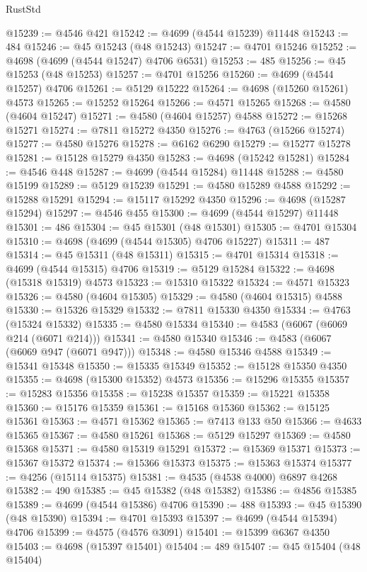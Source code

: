 \begin{lexlean}{RustStd}
\begin{coremodule}
@15239 := @4546 @421
@15242 := @4699 (@4544 @15239) @11448
@15243 := 484
@15246 := @45 @15243 (@48 @15243)
@15247 := @4701 @15246
@15252 := @4698 (@4699 (@4544 @15247) @4706 @6531)
@15253 := 485
@15256 := @45 @15253 (@48 @15253)
@15257 := @4701 @15256
@15260 := @4699 (@4544 @15257) @4706
@15261 := @5129 @15222
@15264 := @4698 (@15260 @15261) @4573
@15265 := @15252 @15264
@15266 := @4571 @15265
@15268 := @4580 (@4604 @15247)
@15271 := @4580 (@4604 @15257) @4588
@15272 := @15268 @15271
@15274 := @7811 @15272 @4350
@15276 := @4763 (@15266 @15274)
@15277 := @4580 @15276
@15278 := @6162 @6290
@15279 := @15277 @15278
@15281 := @15128 @15279 @4350
@15283 := @4698 (@15242 @15281)
@15284 := @4546 @448
@15287 := @4699 (@4544 @15284) @11448
@15288 := @4580 @15199
@15289 := @5129 @15239
@15291 := @4580 @15289 @4588
@15292 := @15288 @15291
@15294 := @15117 @15292 @4350
@15296 := @4698 (@15287 @15294)
@15297 := @4546 @455
@15300 := @4699 (@4544 @15297) @11448
@15301 := 486
@15304 := @45 @15301 (@48 @15301)
@15305 := @4701 @15304
@15310 := @4698 (@4699 (@4544 @15305) @4706 @15227)
@15311 := 487
@15314 := @45 @15311 (@48 @15311)
@15315 := @4701 @15314
@15318 := @4699 (@4544 @15315) @4706
@15319 := @5129 @15284
@15322 := @4698 (@15318 @15319) @4573
@15323 := @15310 @15322
@15324 := @4571 @15323
@15326 := @4580 (@4604 @15305)
@15329 := @4580 (@4604 @15315) @4588
@15330 := @15326 @15329
@15332 := @7811 @15330 @4350
@15334 := @4763 (@15324 @15332)
@15335 := @4580 @15334
@15340 := @4583 (@6067 (@6069 @214 (@6071 @214)))
@15341 := @4580 @15340
@15346 := @4583 (@6067 (@6069 @947 (@6071 @947)))
@15348 := @4580 @15346 @4588
@15349 := @15341 @15348
@15350 := @15335 @15349
@15352 := @15128 @15350 @4350
@15355 := @4698 (@15300 @15352) @4573
@15356 := @15296 @15355
@15357 := @15283 @15356
@15358 := @15238 @15357
@15359 := @15221 @15358
@15360 := @15176 @15359
@15361 := @15168 @15360
@15362 := @15125 @15361
@15363 := @4571 @15362
@15365 := @7413 @133 @50
@15366 := @4633 @15365
@15367 := @4580 @15261
@15368 := @5129 @15297
@15369 := @4580 @15368
@15371 := @4580 @15319 @15291
@15372 := @15369 @15371
@15373 := @15367 @15372
@15374 := @15366 @15373
@15375 := @15363 @15374
@15377 := @4256 (@15114 @15375)
@15381 := @4535 (@4538 @4000) @6897 @4268
@15382 := 490
@15385 := @45 @15382 (@48 @15382)
@15386 := @4856 @15385
@15389 := @4699 (@4544 @15386) @4706
@15390 := 488
@15393 := @45 @15390 (@48 @15390)
@15394 := @4701 @15393
@15397 := @4699 (@4544 @15394) @4706
@15399 := @4575 (@4576 @3091)
@15401 := @15399 @6367 @4350
@15403 := @4698 (@15397 @15401)
@15404 := 489
@15407 := @45 @15404 (@48 @15404)

\end{coremodule}
\end{lexlean}
